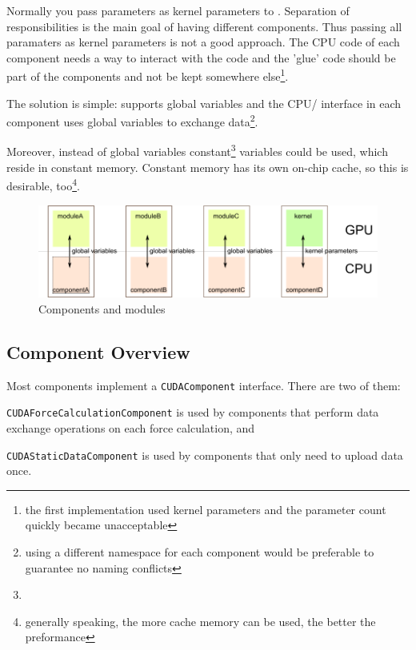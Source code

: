 Normally you pass parameters as kernel parameters to \cuda{}. Separation of responsibilities is the main goal of having different components. Thus passing all paramaters as kernel parameters is not a good approach. The CPU code of each component needs a way to interact with the \cuda{} code and the 'glue' code should be part of the components and not be kept somewhere else\footnote{the first implementation used kernel parameters and the parameter count quickly became unacceptable}.

The solution is simple: \cuda{} supports global variables and the CPU/\cuda{} interface in each component uses global variables to exchange data\footnote{using a different namespace for each component would be preferable to guarantee no naming conflicts}.

Moreover, instead of global variables constant\footnote{} variables could be used, which reside in constant memory. Constant memory has its own on-chip cache, so this is desirable, too\footnote{generally speaking, the more cache memory can be used, the better the preformance}.

\begin{figure}
\caption{Components and \cuda{} modules}
\includegraphics{figures/component_architecture.pdf}
\end{figure}

\subsection{Component Overview}
Most components implement a \lstinline!CUDAComponent! interface. There are two of them:
\begin{compactitem}
\item \lstinline!CUDAForceCalculationComponent! is used by components that perform data exchange operations on each force calculation, and
\item \lstinline!CUDAStaticDataComponent! is used by components that only need to upload data once.
\end{compactitem}


